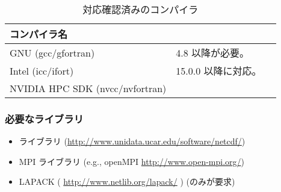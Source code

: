 

\begin{table}[htb]
\begin{center}
\caption{対応確認済みのコンパイラ}
\begin{tabularx}{150mm}{|l|X|X|} \hline
 \rowcolor[gray]{0.9} コンパイラ名 & \\ \hline
 GNU (gcc/gfortran)    & 4.8 以降が必要。 \\ \hline
 Intel (icc/ifort)     & 15.0.0 以降に対応。 \\ \hline
 NVIDIA HPC SDK (nvcc/nvfortran)   &           \\ \hline
\end{tabularx}
\label{tab:compatible_compiler}
\end{center}
\end{table}

\subsubsection{\bf 必要なライブラリ}\label{sec:inst_env}
  \begin{itemize}
   \item {\netcdf} ライブラリ (\url{http://www.unidata.ucar.edu/software/netcdf/})
   \item MPI ライブラリ (e.g., openMPI \url{http://www.open-mpi.org/})
   \item LAPACK ( \url{http://www.netlib.org/lapack/} ) (\scalegm のみが要求)
  \end{itemize}

